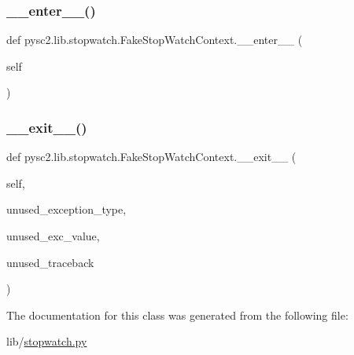 \subsubsection{\texorpdfstring{\+\_\+\+\_\+enter\+\_\+\+\_\+()}{\_\_enter\_\_()}}
{\footnotesize\ttfamily def pysc2.\+lib.\+stopwatch.\+Fake\+Stop\+Watch\+Context.\+\_\+\+\_\+enter\+\_\+\+\_\+ (\begin{DoxyParamCaption}\item[{}]{self }\end{DoxyParamCaption})}

\mbox{\label{classpysc2_1_1lib_1_1stopwatch_1_1_fake_stop_watch_context_a039be4e6cc198a84e03e20002d97d34f}} 
\subsubsection{\texorpdfstring{\+\_\+\+\_\+exit\+\_\+\+\_\+()}{\_\_exit\_\_()}}
{\footnotesize\ttfamily def pysc2.\+lib.\+stopwatch.\+Fake\+Stop\+Watch\+Context.\+\_\+\+\_\+exit\+\_\+\+\_\+ (\begin{DoxyParamCaption}\item[{}]{self,  }\item[{}]{unused\+\_\+exception\+\_\+type,  }\item[{}]{unused\+\_\+exc\+\_\+value,  }\item[{}]{unused\+\_\+traceback }\end{DoxyParamCaption})}



The documentation for this class was generated from the following file\+:\begin{DoxyCompactItemize}
\item 
lib/\mbox{\hyperlink{stopwatch_8py}{stopwatch.\+py}}\end{DoxyCompactItemize}
